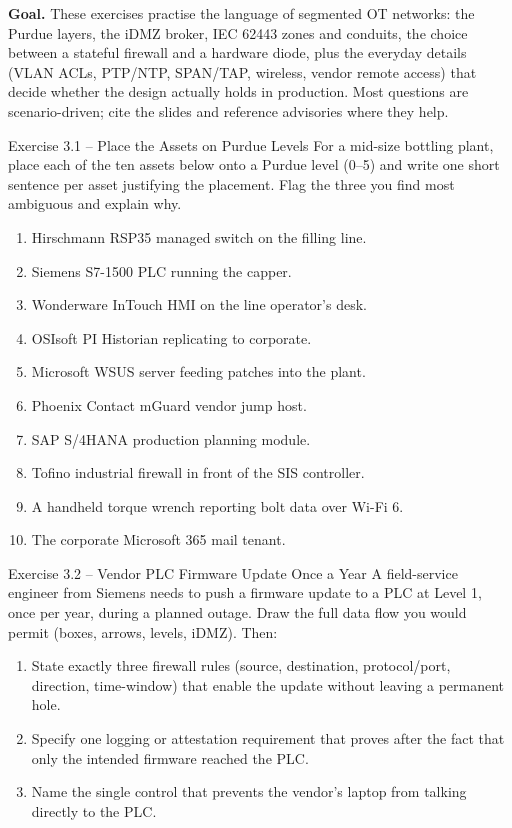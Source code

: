 \documentclass[11pt,a4paper]{article}
\begin{document}
\sheetheader

\noindent\textbf{Goal.} These exercises practise the language of segmented OT networks: the Purdue layers, the iDMZ broker, IEC 62443 zones and conduits, the choice between a stateful firewall and a hardware diode, plus the everyday details (VLAN ACLs, PTP/NTP, SPAN/TAP, wireless, vendor remote access) that decide whether the design actually holds in production. Most questions are scenario-driven; cite the slides and reference advisories where they help.

\begin{taskbox}{Exercise 3.1 -- Place the Assets on Purdue Levels}
For a mid-size bottling plant, place each of the ten assets below onto a Purdue level (0--5) and write one short sentence per asset justifying the placement. Flag the three you find most ambiguous and explain why.

\begin{enumerate}\setlength{\itemsep}{1pt}
  \item Hirschmann RSP35 managed switch on the filling line.
  \item Siemens S7-1500 PLC running the capper.
  \item Wonderware InTouch HMI on the line operator's desk.
  \item OSIsoft PI Historian replicating to corporate.
  \item Microsoft WSUS server feeding patches into the plant.
  \item Phoenix Contact mGuard vendor jump host.
  \item SAP S/4HANA production planning module.
  \item Tofino industrial firewall in front of the SIS controller.
  \item A handheld torque wrench reporting bolt data over Wi-Fi 6.
  \item The corporate Microsoft 365 mail tenant.
\end{enumerate}
\end{taskbox}

\begin{taskbox}{Exercise 3.2 -- Vendor PLC Firmware Update Once a Year}
A field-service engineer from Siemens needs to push a firmware update to a PLC at Level 1, once per year, during a planned outage. Draw the full data flow you would permit (boxes, arrows, levels, iDMZ). Then:
\begin{enumerate}\setlength{\itemsep}{1pt}
  \item State exactly three firewall rules (source, destination, protocol/port, direction, time-window) that enable the update without leaving a permanent hole.
  \item Specify one logging or attestation requirement that proves after the fact that only the intended firmware reached the PLC.
  \item Name the single control that prevents the vendor's laptop from talking directly to the PLC.
\end{enumerate}
\end{taskbox}
\end{document}

